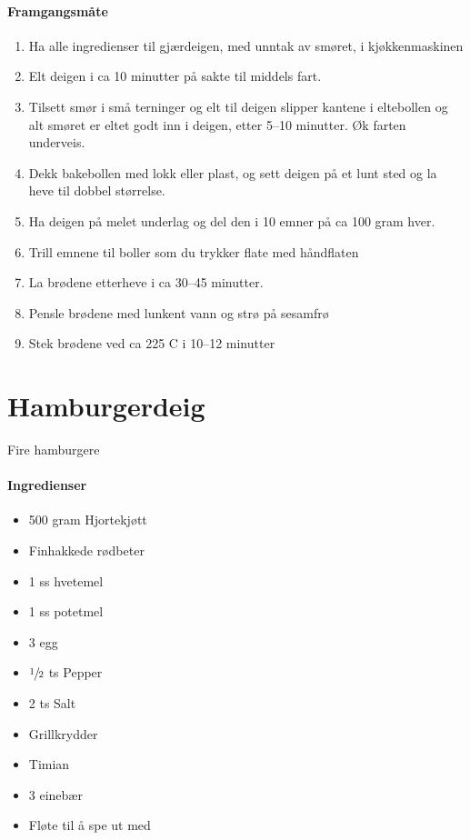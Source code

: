 \documentclass[12pt,a4paper]{book}
\begin{document}
\paragraph{Framgangsmåte}
\begin{enumerate}[noitemsep]
	\item Ha alle ingredienser til gjærdeigen, med unntak av smøret, i kjøkkenmaskinen
	\item Elt deigen i ca 10 minutter på sakte til middels fart.
	\item Tilsett smør i små terninger og elt til deigen slipper kantene i eltebollen og alt smøret er eltet godt inn i deigen, etter 5--10 minutter. Øk farten underveis.
	\item Dekk bakebollen med lokk eller plast, og sett deigen på et lunt sted og la heve til dobbel størrelse.
	\item Ha deigen på melet underlag og del den i 10 emner på ca 100 gram hver.
	\item Trill emnene til boller som du trykker flate med håndflaten
	\item La brødene etterheve i ca 30--45 minutter.
	\item Pensle brødene med lunkent vann og strø på sesamfrø
	\item Stek brødene ved ca 225 \degree C i 10--12 minutter
\end{enumerate}
\clearpage{}
\clearpage{}\section{﻿Hamburgerdeig}
Fire hamburgere

\paragraph{Ingredienser}
\begin{itemize}[noitemsep]
	\item 500 gram Hjortekjøtt
	\item	Finhakkede rødbeter
	\item	1 ss hvetemel
	\item	1 ss potetmel
	\item	3 egg
	\item	 $\sfrac{1}{2}$  ts Pepper
	\item	2 ts Salt
	\item	Grillkrydder
	\item	Timian
	\item	3 einebær
	\item	Fløte til å spe ut med
\end{itemize}
\end{document}
